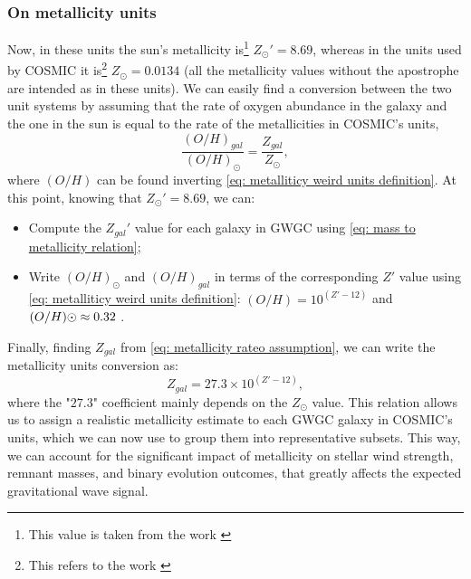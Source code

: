 \subsubsection{On metallicity units}\label{sec:on_metallicity_units} %
Now, in these units the sun's metallicity is\footnote{This value is taken from the work \cite{AllendePrieto}} $Z_\odot ' = 8.69$, whereas in the units used by COSMIC it is\footnote{This refers to the work \cite{Asplund}} $Z_\odot=0.0134$ (all the metallicity values without the apostrophe are intended as in these units).
We can easily find a conversion between the two unit systems by assuming that the rate of oxygen abundance in the galaxy and the one in the sun is equal to the rate of the metallicities in COSMIC's units,
\begin{equation}
    \frac{(O/H)_{gal}}{(O/H)_\odot}=\frac{Z_{gal}}{Z_\odot},
    \label{eq: metallicity rateo assumption}
\end{equation}
where $(O/H)$ can be found inverting \eqref{eq: metalliticy weird units definition}. 
At this point, knowing that $Z_\odot ' = 8.69$, we can:
\begin{itemize}
    \item Compute the $Z_{gal}'$ value for each galaxy in GWGC using \eqref{eq: mass to metallicity relation};
    \item Write $(O/H)_\odot$ and $(O/H)_{gal}$ in terms of the corresponding  $Z'$ value using \eqref{eq: metalliticy weird units definition}: $(O/H)=10^{(Z'-12)}$ and  $(O/H)\odot \approx 0.32\hspace{1mm}$. 
\end{itemize}
Finally, finding $Z_{gal}$ from \eqref{eq: metallicity rateo assumption}, we can write the metallicity units conversion as:
\begin{equation}
    Z_{gal}=27.3\times10^{(Z'-12)},
    \label{eq: Metallicity unit conversion}
\end{equation}
where the "$27.3$" coefficient mainly depends on the $Z_\odot$ value.
This relation allows us to assign a realistic metallicity estimate to each GWGC galaxy in COSMIC's units, which we can now use to group them into representative subsets. 
This way, we can account for the significant impact of metallicity on stellar wind strength, remnant masses, and binary evolution outcomes, that greatly affects the expected gravitational wave signal.


